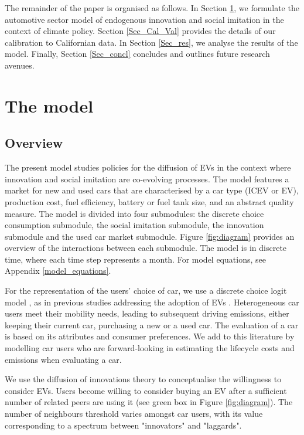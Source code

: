 \documentclass[12pt]{article}
\begin{document}
The remainder of the paper is organised as follows. In Section \ref{Sec_Model}, we formulate the automotive sector model of endogenous innovation and social imitation in the context of climate policy. Section \ref{Sec_Cal_Val} provides the details of our calibration to Californian data. In Section \ref{Sec_res}, we analyse the results of the model. Finally, Section \ref{Sec_concl} concludes and outlines future research avenues.
	
	\section{The model} \label{Sec_Model}
	\subsection{Overview} \label{Model_General}
	The present model studies policies for the diffusion of EVs in the context where innovation and social imitation are co-evolving processes. The model features a market for new and used cars that are characterised by a car type (ICEV or EV), production cost, fuel efficiency, battery or fuel tank size, and an abstract quality measure. The model is divided into four submodules: the discrete choice consumption submodule, the social imitation submodule, the innovation submodule and the used car market submodule. Figure \ref{fig:diagram} provides an overview of the interactions between each submodule. The model is in discrete time, where each time step represents a month. For model equations, see Appendix \ref{model_equations}. 
	
	For the representation of the users' choice of car, we use a discrete choice logit model \citep{McFadden1974}, as in previous studies addressing the adoption of EVs \citep{EGGERS201151,shafiei2012agent,ostli2017generic}. Heterogeneous car users meet their mobility needs, leading to subsequent driving emissions, either keeping their current car, purchasing a new or a used car. The evaluation of a car is based on its attributes and consumer preferences. We add to this literature by modelling car users who are forward-looking in estimating the lifecycle costs and emissions when evaluating a car. %
	
	We use the diffusion of innovations theory \citep{rogers2003diffusion} to conceptualise the willingness to consider EVs. Users become willing to consider buying an EV after a sufficient number of related peers are using it (see green box in Figure \ref{fig:diagram}). The number of neighbours threshold varies amongst car users, with its value corresponding to a spectrum between "innovators" and "laggards". 
	
\end{document}
